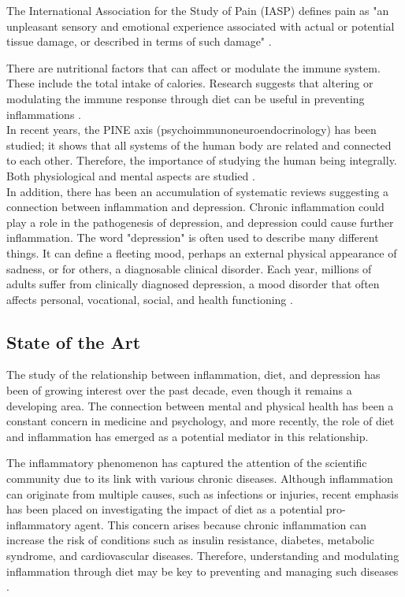\documentclass[jou]{apa7}
\begin{document}
	The International Association for the Study of Pain (IASP) defines pain as "an unpleasant sensory and emotional experience associated with actual or potential tissue damage, or described in terms of such damage" \parencite{PainTermsList1979}.


	There are nutritional factors that can affect or modulate the immune system. These include the total intake of calories. Research suggests that altering or modulating the immune response through diet can be useful in preventing inflammations \parencite{GarciaCasal2014}.\\

	In recent years, the PINE axis (psychoimmunoneuroendocrinology) has been studied; it shows that all systems of the human body are related and connected to each other. Therefore, the importance of studying the human being integrally. Both physiological and mental aspects are studied \parencite{Osimo2019}.\\

	In addition, there has been an accumulation of systematic reviews suggesting a connection between inflammation and depression. Chronic inflammation could play a role in the pathogenesis of depression, and depression could cause further inflammation. The word "depression" is often used to describe many different things. It can define a fleeting mood, perhaps an external physical appearance of sadness, or for others, a diagnosable clinical disorder. Each year, millions of adults suffer from clinically diagnosed depression, a mood disorder that often affects personal, vocational, social, and health functioning \parencite{APA2014}.


\subsection{State of the Art}

The study of the relationship between inflammation, diet, and depression has
been of growing interest over the past decade, even though it remains a developing area. The connection between mental and physical health has been a constant concern in medicine and psychology, and more recently, the role of diet and inflammation has emerged as a potential mediator in this relationship.

The inflammatory phenomenon has captured the attention of the scientific community due to its link with various chronic diseases. Although inflammation can originate from multiple causes, such as infections or injuries, recent emphasis has been placed on investigating the impact of diet as a potential pro-inflammatory agent. This concern arises because chronic inflammation can increase the risk of conditions such as insulin resistance, diabetes, metabolic syndrome, and cardiovascular diseases. Therefore, understanding and modulating inflammation through diet may be key to preventing and managing such diseases \parencites{daneshLowGradeInflammation2000}{ridkerHighsensitivityCreactiveProtein2004}{salas-salvadoConjugatedLinoleicAcid2006}.
\end{document}
